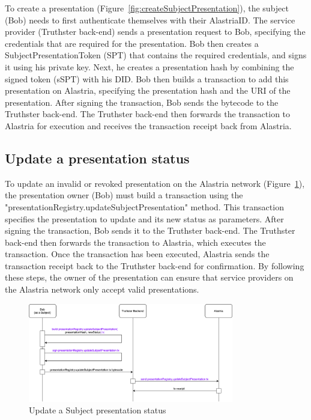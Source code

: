 \documentclass[target=mst,aauheader=]{thud}
\begin{document}
To create a presentation (Figure~\ref{fig:createSubjectPresentation}), the subject (Bob) needs to first authenticate themselves with their AlastriaID. The service provider (Truthster back-end) sends a presentation request to Bob, specifying the credentials that are required for the presentation. Bob then creates a SubjectPresentationToken (SPT) that contains the required credentials, and signs it using his private key. Next, he creates a presentation hash by combining the signed token (sSPT) with his DID. Bob then builds a transaction to add this presentation on Alastria, specifying the presentation hash and the URI of the presentation. After signing the transaction, Bob sends the bytecode to the Truthster back-end. The Truthster back-end then forwards the transaction to Alastria for execution and receives the transaction receipt back from Alastria.

\subsection{Update a presentation status}

To update an invalid or revoked presentation on the Alastria network (Figure~\ref{fig:updateSubjectPresentation}), the presentation owner (Bob) must build a transaction using the "presentationRegistry.updateSubjectPresentation" method. This transaction specifies the presentation to update and its new status as parameters. After signing the transaction, Bob sends it to the Truthster back-end. The Truthster back-end then forwards the transaction to Alastria, which executes the transaction. Once the transaction has been executed, Alastria sends the transaction receipt back to the Truthster back-end for confirmation. By following these steps, the owner of the presentation can ensure that service providers on the Alastria network only accept valid presentations.

\begin{figure}
    \centering
    \includegraphics[width=0.8\textwidth]{images/updateSubjectPresentation.png}
    \caption{Update a Subject presentation status}
    \label{fig:updateSubjectPresentation}
\end{figure}
\end{document}
